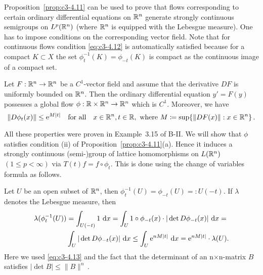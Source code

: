 Proposition~\ref{prop:c3-4.11} can be used to prove that flows corresponding to certain
ordinary differential equations on $\mathbb{R} ^n$ generate strongly continuous
semigroups on $L^p(\mathbb{R} ^n)$ (where $\mathbb{R} ^n$ is equipped with the Lebesgue
measure). One has to impose conditions on the corresponding vector
field. Note that for continuous flows condition \eqref{eq:c3-4.12} is automatically satisfied because for a compact $K \subset X$ the set $\phi_t^{-1}(K) = \phi_{-t}(K)$
is compact as the continuous image of a compact set.

\begin{example}\label{ex:c3-4.12}
Let $F : \mathbb{R} ^n \to \mathbb{R} ^n$ be a $C^1$-vector field and assume that
the derivative $DF$ is uniformly bounded on $\mathbb{R} ^n$. Then the ordinary
differential equation $y' = F(y)$ possesses a global flow
$\phi : \mathbb{R}  \times \mathbb{R} ^n \to \mathbb{R} ^n$ which is $C^1$. Moreover, we have
\begin{equation}\label{eq:c3-4.13}
	\|D\phi_t(x)\| \leq \mathrm{e}^{M|t|} \quad \text{for all} \quad x \in \mathbb{R} ^n, t \in \mathbb{R} , \text{ where }  M \coloneqq  \sup \{\|DF(x)\| : x \in \mathbb{R} ^n\}\,. 
\end{equation}

All these properties were proven in Example~3.15 of B-II.
We will show that $\phi$ satisfies condition (ii) of Proposition~\ref{prop:c3-4.11}(a). 
Hence it induces a strongly continuous (semi-)group of lattice homomorphisms
on $L(\mathbb{R} ^n)$ $(1 \leq p < \infty)$ via $T(t)f = f \circ \phi_t$.
This is done using the change of variables formula as follows.

Let $U$ be an open subset of $\mathbb{R} ^n$, then $\phi_t^{-1}(U) = \phi_{-t}(U) =: U(-t)$. 
If $\lambda$ denotes the Lebesgue measure, then
\begin{equation}\label{eq:c3-4.14}
	\begin{aligned}
		\lambda(\phi_t^{-1}(U)) &= \int_{U(-t)} 1 \, \mathop{}\!\mathrm{d}{x}  = \int_{U} 1 \circ \phi_{-t}(x) \cdot |\det D\phi_{-t}(x)| \, \mathop{}\!\mathrm{d}{x}  = \\
		&\int_{U} |\det D\phi_{-t}(x)| \, \mathop{}\!\mathrm{d}{x}  \leq \int_{U} \mathrm{e}^{nM|t|} \, \mathop{}\!\mathrm{d}{x}  = \mathrm{e}^{nM|t|} \cdot \lambda(U).
	\end{aligned}
\end{equation}
Here we used \eqref{eq:c3-4.13} and the fact that the determinant of an n$\times$n-matrix
$B$ satisfies $|\det B| \leq \|B\|^n$\,.
\end{example}

